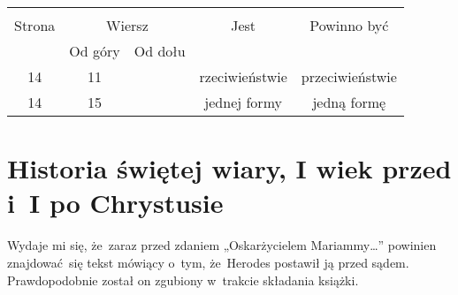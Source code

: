 \documentclass[a4paper,11pt]{article}
\begin{document}
\begin{center}

  \begin{tabular}{|c|c|c|c|c|}
    \hline
    & \multicolumn{2}{c|}{} & & \\
    Strona & \multicolumn{2}{c|}{Wiersz} & Jest
                              & Powinno być \\ \cline{2-3}
    & Od góry & Od dołu & & \\
    \hline
    14 & 11 & & rzeciwieństwie & przeciwieństwie \\
    14 & 15 & & jednej formy & jedną formę \\
    \hline
  \end{tabular}

\end{center}

\vspace{\spaceTwo}










\section{Historia świętej wiary, I wiek przed i~I po Chrystusie}

\vspace{\spaceTwo}







\start {} Wydaje mi się, że~zaraz przed zdaniem
„Oskarżycielem Mariammy\ldots” powinien znajdować~się tekst mówiący
o~tym, że~Herodes postawił ją przed sądem. Prawdopodobnie został on
zgubiony w~trakcie składania książki.
\end{document}
